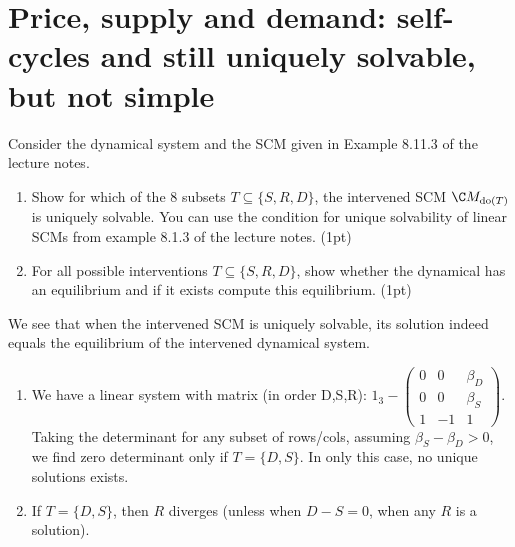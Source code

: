 \section{Price, supply and demand: self-cycles and still uniquely solvable, but not simple}
Consider the dynamical system and the SCM given in Example 8.11.3 of the lecture notes.
\begin{enumerate}
	\item Show for which of the 8 subsets $T \subseteq \{S, R, D\}$, the intervened SCM $\C M_{\text{do}(T)}$ is uniquely solvable. You can use the condition for unique solvability of linear SCMs from example 8.1.3 of the lecture notes. (1pt)
	\item For all possible interventions $T \subseteq \{S, R, D\}$, show whether the dynamical has an equilibrium and if it exists compute this equilibrium. (1pt)
\end{enumerate}
We see that when the intervened SCM is uniquely solvable, its solution indeed equals the equilibrium of the intervened dynamical system.
\begin{gradedsolution}
\begin{enumerate}
	\item We have a linear system with matrix (in order D,S,R): $1_3 - \begin{pmatrix}0 & 0 & \beta_D \\ 0 & 0 & \beta_S \\ 1 & -1 & 1\end{pmatrix}$. Taking the determinant for any subset of rows/cols, assuming $\beta_S-\beta_D>0$, we find zero determinant only if $T=\{D, S\}$. In only this case, no unique solutions exists.
	\item If $T=\{D, S\}$, then $R$ diverges (unless when $D-S=0$, when any $R$ is a solution).
\end{enumerate}
\end{gradedsolution}



